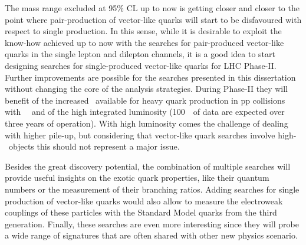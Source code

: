 The mass range excluded at 95\% CL up to now
is getting closer and closer to the point where pair-production
of vector-like quarks will start to be disfavoured with respect
to single production. In this sense, while it is desirable to
exploit the know-how achieved up to now with the searches for
pair-produced vector-like quarks in the single lepton and dilepton
channels, it is a good idea to start designing searches for
single-produced vector-like quarks for LHC Phase-II.
Further improvements are possible for the searches
presented in this dissertation without changing the core of
the analysis strategies. During Phase-II they will benefit
of the increased \cme\ available for heavy quark production
in pp collisions with ~\tev\ and of the high integrated
luminosity (100~\ifb\ of data are expected over three years
of operation). With high luminosity comes the challenge of
dealing with higher pile-up, but considering that vector-like
quark searches involve high-\pt\ objects this should not
represent a major issue.

Besides the great discovery potential, the combination
of multiple searches will provide useful insights on the
exotic quark properties, like their quantum numbers or
the measurement of their branching ratios. 
Adding searches for single production of vector-like quarks
would also allow to measure the electroweak couplings of
these particles with the Standard Model quarks from the third generation.
Finally, these searches are even more interesting since
they will probe a wide range of
signatures that are often shared with other new physics
scenario.
